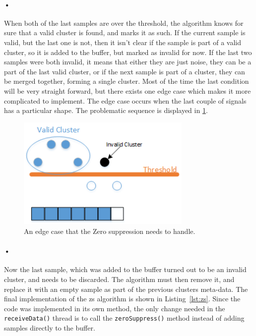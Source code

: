 \documentclass[a4paper, 12pt]{report}
\newcommand{\codeword}[1]{\texttt{#1}}
\begin{document}
\paragraph{•}
When both of the last samples are over the threshold, the algorithm knows for sure that a valid cluster is found, and marks it as such.
If the current sample is valid, but the last one is not, then it isn't clear if the sample is part of a valid cluster, so it is added to the buffer, but marked as invalid for now.
If the last two samples were both invalid, it means that either they are just noise, they can be a part of the last valid cluster, or if the next sample is part of a cluster, they can be merged together, forming a single cluster.
Most of the time the last condition will be very straight forward, but there exists one edge case which makes it more complicated to implement.
The edge case occurs when the last couple of signals has a particular shape.
The problematic sequence is displayed in \ref{fig:zs-prob}.

\begin{figure}[h!]
	\centering
		\includegraphics[width=0.75\textwidth]{images/zs-prob.png}
		\caption{An edge case that the Zero suppression needs to handle.}
		\label{fig:zs-prob}
\end{figure}

\paragraph{•}
Now the last sample, which was added to the buffer turned out to be an invalid cluster, and needs to be discarded.
The algorithm must then remove it, and replace it with an empty sample as part of the previous clusters meta-data.
The final implementation of the \gls{zs} algorithm is shown in Listing~\ref{lst:zs}.
Since the code was implemented in its own method, the only change needed in the \codeword{receiveData()} thread is to call the \codeword{zeroSuppress()} method instead of adding samples directly to the buffer.
\end{document}

